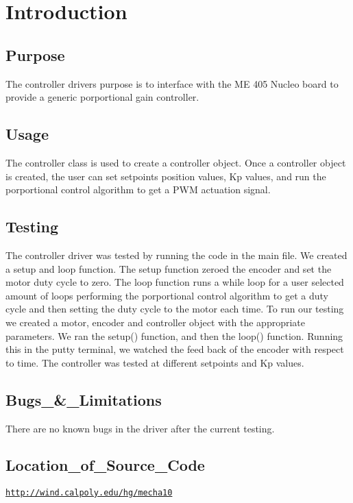 \hypertarget{index_intro}{}\section{Introduction}\label{index_intro}
\hypertarget{index_purpose}{}\subsection{Purpose}\label{index_purpose}
The controller driver\textquotesingle{}s purpose is to interface with the ME 405 Nucleo board to provide a generic porportional gain controller. \hypertarget{index_usage}{}\subsection{Usage}\label{index_usage}
The controller class is used to create a controller object. Once a controller object is created, the user can set setpoints position values, Kp values, and run the porportional control algorithm to get a P\+WM actuation signal. \hypertarget{index_testing}{}\subsection{Testing}\label{index_testing}
The controller driver was tested by running the code in the main file. We created a setup and loop function. The setup function zeroed the encoder and set the motor duty cycle to zero. The loop function runs a while loop for a user selected amount of loops performing the porportional control algorithm to get a duty cycle and then setting the duty cycle to the motor each time. To run our testing we created a motor, encoder and controller object with the appropriate parameters. We ran the setup() function, and then the loop() function. Running this in the putty terminal, we watched the feed back of the encoder with respect to time. The controller was tested at different setpoints and Kp values. \hypertarget{index_bugs}{}\subsection{Bugs\+\_\+\&\+\_\+\+Limitations}\label{index_bugs}
There are no known bugs in the driver after the current testing. \hypertarget{index_location}{}\subsection{Location\+\_\+of\+\_\+\+Source\+\_\+\+Code}\label{index_location}
\href{http://wind.calpoly.edu/hg/mecha10}{\tt http\+://wind.\+calpoly.\+edu/hg/mecha10} 